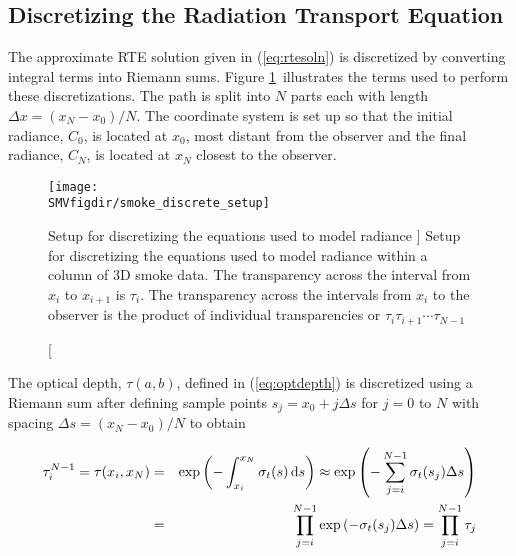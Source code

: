 \subsection{Discretizing the Radiation Transport Equation}
\newcommand{\htau}[1]{\tau_{#1}^{N-1}}
\newcommand{\halpha}[1]{\alpha_{#1}^{N-1}}
\newcommand{\sigai}[1]{\sigma_{a,#1}}
\newcommand{\Lei}[1]{C_{e,#1}}
\newcommand{\Lhatj}[1]{C_{#1}^N}
\newcommand{\Lhatjj}[1]{\hat{C}_{#1}^N}
\newcommand{\Chatjj}[1]{\hat{C}_{#1}^N}
\newcommand{\Leii}[1]{\hat{C}_{e,#1}}

The approximate RTE solution given in (\ref{eq:rtesoln}) is
discretized by converting integral terms into Riemann sums. Figure
\ref{fig:smokediscretesetup}\ illustrates the terms used to
perform these discretizations.  The path is split into $N$ parts
each with length $\Delta x=(x_N-x_0)/N$.  The coordinate system is
set up so that the initial radiance, $C_0$, is located at $x_0$,
most distant from the observer and the final radiance, $C_N$, is
located at $x_N$ closest to the observer.

\begin{figure}[bph]
\begin{center}
\texttt{[image: \\SMVfigdir/smoke\_discrete\_setup]}
\end{center}
\caption
[Setup for discretizing the equations used to model radiance ]
{Setup for discretizing
the equations used to model radiance within a column of 3D smoke
data. The transparency across the interval from $x_i$ to $x_{i+1}$
is $\tau_i$. The transparency across the intervals from $x_i$ to
the observer is the product of individual transparencies or
$\tau_i\tau_{i+1}\cdots\tau_{N-1}$} \label{fig:smokediscretesetup}
\end{figure}

The optical depth, $\tau(a,b)$, defined in (\ref{eq:optdepth}) is
discretized using a Riemann sum  after defining sample points
$s_j=x_0+j\Delta s$ for $j=0$ to $N$ with spacing $\Delta
s=(x_N-x_0)/N$ to obtain

\begin{eqnarray}
\htau{i}=\tau(x_i,x_N)&=&\exp\left(-\int_{x_i}^{x_N}\sigma_t(s)\dx{s}\right)\approx\exp\left(-\sum_{j=i}^{N-1}\sigma_t(s_j)\Delta s\right)\\
&=&\prod_{j=i}^{N-1}\exp\left(-\sigma_t(s_j)\Delta s\right)=\prod_{j=i}^{N-1}\tau_j
\end{eqnarray}

